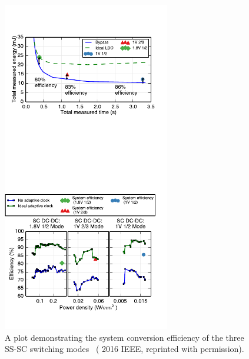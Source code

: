 \documentclass[graybox]{svmult}
\begin{document}
\begin{figure}
  \centering
  \includegraphics[width=0.65\textwidth]{6-raven3-dcdc-efficiency}
  \caption{A plot demonstrating the system conversion efficiency of the three SS-SC switching modes~\cite{Zimmer2016} ({\textcopyright} 2016 IEEE, reprinted with permission).}
  \label{fig:6-raven3-dcdc-efficiency}
\end{figure}
\end{document}
